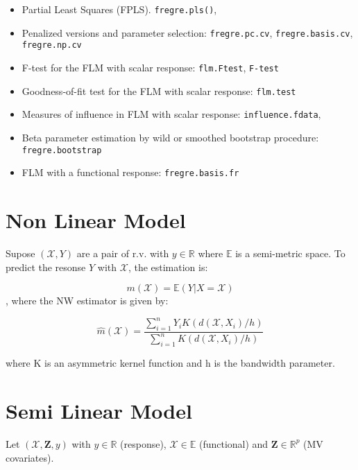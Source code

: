 \documentclass[
]{book}
\begin{document}
\begin{itemize}
\item
  Partial Least Squares (FPLS). \texttt{fregre.pls()}, \citep[\citet{pedra2005}]{kramer}
\item
  Penalized versions and parameter selection: \texttt{fregre.pc.cv}, \texttt{fregre.basis.cv}, \texttt{fregre.np.cv} \citep{Febrero2012}
\item
  F-test for the FLM with scalar response: \texttt{flm.Ftest}, \texttt{F-test} \citep{garcia2014goodness}
\item
  Goodness-of-fit test for the FLM with scalar response: \texttt{flm.test} \citep{garcia2014goodness}
\item
  Measures of influence in FLM with scalar response: \texttt{influence.fdata},\citep{Febrero2010}
\item
  Beta parameter estimation by wild or smoothed bootstrap procedure: \texttt{fregre.bootstrap}
\item
  FLM with a functional response: \texttt{fregre.basis.fr} \citep{chiou2004functional}
\end{itemize}

\hypertarget{non-linear-model-fv2006}{%
\section{\texorpdfstring{Non Linear Model \citep{FV2006}}{Non Linear Model {[}@FV2006{]}}}\label{non-linear-model-fv2006}}

Supose \((\mathcal{X},Y)\) are a pair of r.v. with \(y\in \mathbb{R}\) where \(\mathbb{E}\) is a semi-metric space. To predict the resonse \(Y\) with \(\mathcal{X}\), the estimation is:

\[m(\mathcal{X})=\mathbb{E}(Y|X=\mathcal{X})\], where the NW estimator is given by:

\[\hat{m}(\mathcal{X})=\frac{\sum_{i=1}^n Y_i{ K(d(\mathcal{X},X_i)/h)}}{\sum_{i=1}^n  {K(d(\mathcal{X},X_i)/h)}}\]

where K is an asymmetric kernel function and h is the bandwidth parameter.

\hypertarget{semi-linear-model-aneiros2005}{%
\section{\texorpdfstring{Semi Linear Model \citep{Aneiros2005}}{Semi Linear Model {[}@Aneiros2005{]}}}\label{semi-linear-model-aneiros2005}}

Let \((\mathcal{X},\mathbf{Z},y)\) with \(y\in \mathbb{R}\) (response), \(\mathcal{X}\in \mathbb{E}\) (functional) and \(\mathbf{Z} \in \mathbb{R}^p\) (MV covariates).
\end{document}
